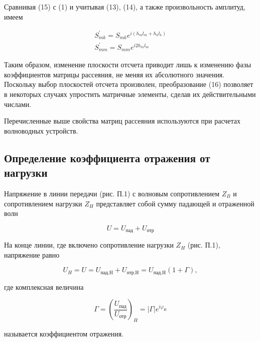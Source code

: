 \documentclass[a4paper,12pt]{article}
\begin{document}
Сравнивая (15) с (1) и учитывая (13), (14), а также произвольность амплитуд, имеем

\begin{equation}
	\begin{array} { l } { S _ { m k } ^ { \prime } = S _ { m k } e ^ { i \left( h _ { m } l _ { m } + h _ { k } l _ { k } \right) } } \\ { S _ { m m } ^ { \prime } = S _ { m m } e ^ { i 2 h _ { m } l _ { m } } } \end{array}
\end{equation}

Таким образом, изменение плоскости отсчета приводит лишь к изменению фазы коэффициентов матрицы рассеяния, не меняя их абсолютного значения. Поскольку выбор плоскостей отсчета произволен, преобразование (16) позволяет в некоторых случаях упростить матричные элементы, сделав их действительными числами.

Перечисленные выше свойства матриц рассеяния используются при расчетах волноводных устройств.

\subsection{Определение коэффициента отражения от нагрузки}


Напряжение в линии передачи (рис. П.1) с волновым сопротивлением $Z_B$ и сопротивлением нагрузки $Z_H$ представляет собой сумму падающей и отраженной волн

\begin{equation}
	U=U_\text{пад}+U_\text{отр}
\end{equation}

На конце линии, где включено сопротивление нагрузки $Z_H$ (рис. П.1), напряжение равно

\begin{equation}
	U_H=U=U_\text{пад,H}+U_\text{отр,H}=U_\text{пад,H}(1+\Gamma),
\end{equation}

где комплексная величина

\begin{equation}
	\Gamma=\left(\frac{U_\text{пад}}{U_\text{отр}}\right)_H= | \Gamma | e ^ { i \varphi _ { \mathrm { H } } }
\end{equation}

называется коэффициентом отражения.
\end{document}
